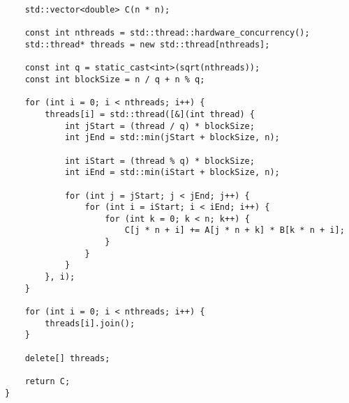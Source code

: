 \documentclass{report}
\begin{document}
\begin{lstlisting}
    std::vector<double> C(n * n);

    const int nthreads = std::thread::hardware_concurrency();
    std::thread* threads = new std::thread[nthreads];

    const int q = static_cast<int>(sqrt(nthreads));
    const int blockSize = n / q + n % q;

    for (int i = 0; i < nthreads; i++) {
        threads[i] = std::thread([&](int thread) {
            int jStart = (thread / q) * blockSize;
            int jEnd = std::min(jStart + blockSize, n);

            int iStart = (thread % q) * blockSize;
            int iEnd = std::min(iStart + blockSize, n);

            for (int j = jStart; j < jEnd; j++) {
                for (int i = iStart; i < iEnd; i++) {
                    for (int k = 0; k < n; k++) {
                        C[j * n + i] += A[j * n + k] * B[k * n + i];
                    }
                }
            }
        }, i);
    }

    for (int i = 0; i < nthreads; i++) {
        threads[i].join();
    }

    delete[] threads;

    return C;
}
\end{lstlisting}
\end{document}
